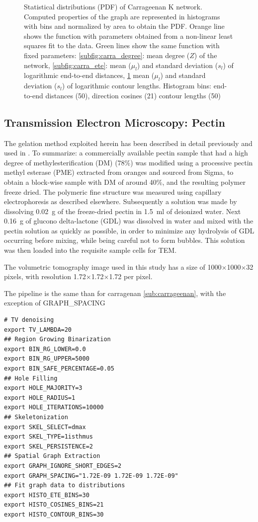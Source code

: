 \begin{figure}[H]
\begin{subfigure}{0.5\textwidth}
    \label{subfig:carra_contour}
  \end{subfigure}
  \caption{Statistical distributions (PDF) of Carrageenan K network. Computed properties of the graph are represented in histograms with bins and normalized by area to obtain the PDF. Orange line shows the function with parameters obtained from a non-linear least squares fit to the data.
    Green lines show the same function with fixed parameters: \ref{subfig:carra_degree}: mean degree ($Z$) of the network, \ref{subfig:carra_ete}: mean ($\mu_l$) and standard deviation ($s_l$) of logarithmic end-to-end distances,
  \ref{subfig:carra_contour} mean ($\mu_l$) and standard deviation ($s_l$) of logarithmic contour lengths.
Histogram bins: end-to-end distances (50), direction cosines (21) contour lengths (50) }
  \label{fig:carra_thin}
\end{figure}

\subsection{Transmission Electron Microscopy: Pectin}%
\label{sub:Pectin}

The gelation method exploited herein has been described in detail previously \cite{mansel_zooming_2015} and used in \cite{hernandez-cerdan_structural_2018-2}.
To summarize: a commercially available pectin sample that had a high degree of methylesterification (DM) (78\%) was modified using a processive pectin methyl esterase (PME) extracted from oranges and sourced from Sigma, to obtain a block-wise sample with DM of around 40\%, and the resulting polymer freeze dried. The polymeric fine structure was measured using capillary electrophoresis as described elsewhere. Subsequently a solution was made by dissolving \SI{0.02}{\g} of the freeze-dried pectin in \SI{1.5}{\ml} of deionized water. Next \SI{0.16}{\g} of glucono delta-lactone (GDL) was dissolved in water and mixed with the pectin solution as quickly as possible, in order to minimize any hydrolysis of GDL occurring before mixing, while being careful not to form bubbles. This solution was then loaded into the requisite sample cells for \gls{TEM}.

The volumetric tomography image used in this study has a size of 1000$\times$1000$\times$32 pixels, with resolution 1.72$\times$1.72$\times$1.72 \nm per pixel.

The pipeline is the same than for carragenan \autoref{sub:carrageenan}, with the exception of GRAPH\_SPACING
\begin{verbatim}
# TV denoising
export TV_LAMBDA=20
## Region Growing Binarization
export BIN_RG_LOWER=0.0
export BIN_RG_UPPER=5000
export BIN_SAFE_PERCENTAGE=0.05
## Hole Filling
export HOLE_MAJORITY=3
export HOLE_RADIUS=1
export HOLE_ITERATIONS=10000
## Skeletonization
export SKEL_SELECT=dmax
export SKEL_TYPE=1isthmus
export SKEL_PERSISTENCE=2
## Spatial Graph Extraction
export GRAPH_IGNORE_SHORT_EDGES=2
export GRAPH_SPACING="1.72E-09 1.72E-09 1.72E-09"
## Fit graph data to distributions
export HISTO_ETE_BINS=30
export HISTO_COSINES_BINS=21
export HISTO_CONTOUR_BINS=30
\end{verbatim}

